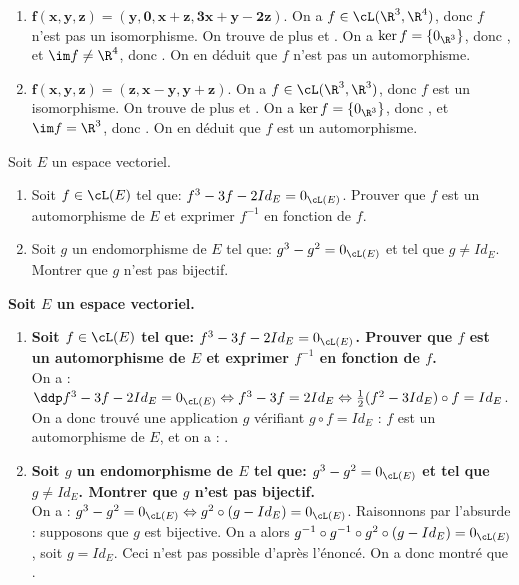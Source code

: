 \documentclass[a4paper, 11pt,reqno]{article}
\begin{document}
\begin{correction}
\begin{enumerate}
		\item $\mathbf{f(x,y,z)=(y,0,x+z,3x+y-2z)}$. On a $f \in \cL(\R^3,\R^4)$, donc $f$ n'est pas un isomorphisme. On trouve de plus  et . On a $\ker f =\{0_{\R^3}\}$, donc , et $\im f \not= \R^4$, donc . On en d\'eduit que $f$ n'est pas un automorphisme.
		\item $\mathbf{f(x,y,z)= (z,x-y,y+z)}$. On a $f \in \cL(\R^3,\R^3)$, donc $f$ est un isomorphisme. On trouve de plus  et . On a $\ker f =\{0_{\R^3}\}$, donc , et $\im f = \R^3$, donc . On en d\'eduit que $f$ est un automorphisme.
	\end{enumerate}
\end{correction}
\begin{exercice}  \;
	Soit $E$ un espace vectoriel.
	\begin{enumerate}
		\item Soit $f\in\cL (E)$ tel que: $f^3-3f-2Id_{E}=0_{\cL(E)}$. Prouver que $f$ est un automorphisme de $E$ et exprimer $f^{-1}$ en fonction de $f$.
		\item Soit $g$ un endomorphisme de $E$ tel que: $g^3-g^2=0_{\cL(E)}$  et tel que $g\not= Id_E$. Montrer que $g$ n'est pas bijectif.
	\end{enumerate}
\end{exercice}
\begin{correction}  \;
	\textbf{Soit $E$ un espace vectoriel.}
	\begin{enumerate}
		\item \textbf{Soit $f\in\cL (E)$ tel que: $f^3-3f-2Id_{E}=0_{\cL(E)}$. Prouver que $f$ est un automorphisme de $E$ et exprimer $f^{-1}$ en fonction de $f$.}\\
		      On a : $\ddp f^3-3f-2Id_{E}=0_{\cL(E)} \Leftrightarrow f^3-3f=2Id_E  \Leftrightarrow \frac{1}{2} (f^2-3 Id_E)\circ f = Id_E$. On a donc trouv\'e une application $g$ v\'erifiant $g \circ f = Id_E$ : $f$ est un automorphisme de $E$, et on a : .
		\item \textbf{Soit $g$ un endomorphisme de $E$ tel que: $g^3-g^2=0_{\cL(E)}$ et tel que $g\not= Id_E$. Montrer que $g$ n'est pas bijectif.}\\
		      On a : $g^3-g^2=0_{\cL(E)}  \Leftrightarrow g^2\circ(g-Id_E) = 0_{\cL(E)}$. Raisonnons par l'absurde : supposons que $g$ est bijective. On a alors $g^{-1}\circ g^{-1} \circ g^2\circ(g-Id_E) = 0_{\cL(E)}$, soit $g=Id_E$. Ceci n'est pas possible d'apr\`es l'\'enonc\'e. On a donc montr\'e que .
	\end{enumerate}
\end{correction}
\end{document}
